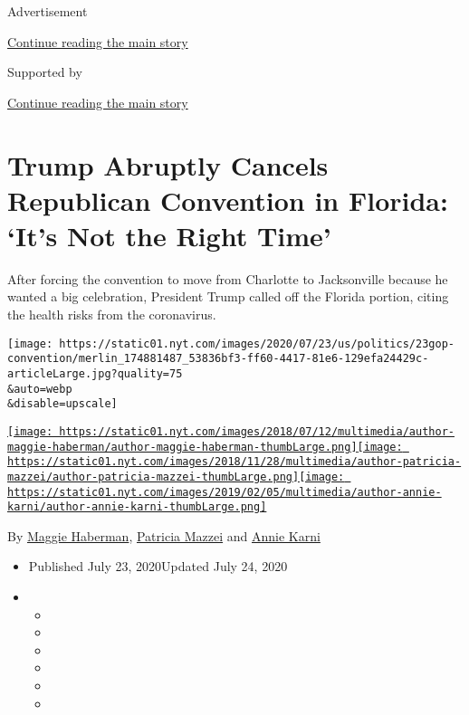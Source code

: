 Advertisement

\protect\hyperlink{after-top}{Continue reading the main story}

Supported by

\protect\hyperlink{after-sponsor}{Continue reading the main story}

\hypertarget{trump-abruptly-cancels-republican-convention-in-florida-its-not-the-right-time}{%
\section{Trump Abruptly Cancels Republican Convention in Florida: `It's
Not the Right
Time'}\label{trump-abruptly-cancels-republican-convention-in-florida-its-not-the-right-time}}

After forcing the convention to move from Charlotte to Jacksonville
because he wanted a big celebration, President Trump called off the
Florida portion, citing the health risks from the coronavirus.

\texttt{[image: https://static01.nyt.com/images/2020/07/23/us/politics/23gop-convention/merlin\_174881487\_53836bf3-ff60-4417-81e6-129efa24429c-articleLarge.jpg?quality=75\\\&auto=webp\\\&disable=upscale]}

\href{https://www.nytimes.com/by/maggie-haberman}{\texttt{[image: https://static01.nyt.com/images/2018/07/12/multimedia/author-maggie-haberman/author-maggie-haberman-thumbLarge.png]}}\href{https://www.nytimes.com/by/patricia-mazzei}{\texttt{[image: https://static01.nyt.com/images/2018/11/28/multimedia/author-patricia-mazzei/author-patricia-mazzei-thumbLarge.png]}}\href{https://www.nytimes.com/by/annie-karni}{\texttt{[image: https://static01.nyt.com/images/2019/02/05/multimedia/author-annie-karni/author-annie-karni-thumbLarge.png]}}

By \href{https://www.nytimes.com/by/maggie-haberman}{Maggie Haberman},
\href{https://www.nytimes.com/by/patricia-mazzei}{Patricia Mazzei} and
\href{https://www.nytimes.com/by/annie-karni}{Annie Karni}

\begin{itemize}
\item
  Published July 23, 2020Updated July 24, 2020
\item
  \begin{itemize}
  \item
  \item
  \item
  \item
  \item
  \item
  \end{itemize}
\end{itemize}

